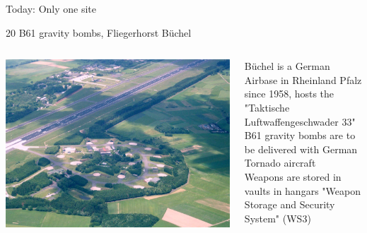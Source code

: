 \documentclass[presentation]{beamer}
\begin{document}
\begin{frame}[label={sec:orge7e1105}]{Today: Only one site}
\vspace{-0.8cm}
\begin{center}
\LARGE 
20 B61 gravity bombs, Fliegerhorst Büchel
\end{center}

\begin{columns}[T]
\begin{column}{0.5\columnwidth}
\begin{imageboxplain}
  \includegraphics[width=\textwidth]{localimages/cc/places/Buechel_Fliegerhorst.jpg}
\end{imageboxplain}
\end{column}
\begin{column}{0.5\columnwidth}
\small

Büchel is a German Airbase in Rheinland Pfalz since 1958, hosts the \\"Taktische Luftwaffengeschwader 33"\\[0.4em]

B61 gravity bombs are to be delivered with German Tornado aircraft \\[0.4em]

Weapons are stored in vaults in hangars "Weapon Storage and Security System" (WS3)
\end{column}
\end{columns}



\end{frame}
\end{document}

